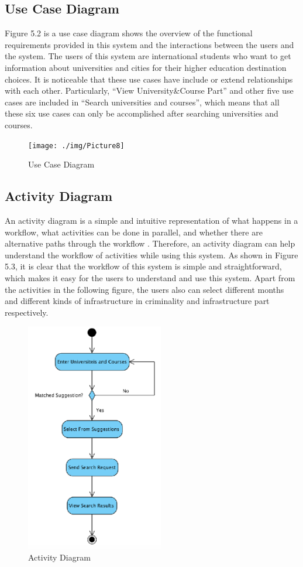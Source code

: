 \subsection{Use Case Diagram}
Figure 5.2 is a use case diagram shows the overview of the functional requirements provided in this system and the interactions between the users and the system. The users of this system are international students who want to get information about universities and cities for their higher education destination choices. It is noticeable that these use cases have include or extend relationships with each other. Particularly, “View University\&Course Part” and other five use cases are included in “Search universities and courses”, which means that all these six use cases can only be accomplished after searching universities and courses.

\begin{figure}[H]
  \centering
  \texttt{[image: ./img/Picture8]}
  \caption{Use Case Diagram}
  \label{Figure:figex}
\end{figure}

\subsection{Activity Diagram}
An activity diagram is a simple and intuitive representation of what happens in a workflow, what activities can be done in parallel, and whether there are alternative paths through the workflow \cite{IBM}. Therefore, an activity diagram can help understand the workflow of activities while using this system. As shown in Figure 5.3, it is clear that the workflow of this system is simple and straightforward, which makes it easy for the users to understand and use this system. Apart from the activities in the following figure, the users also can select different months and different kinds of infrastructure in criminality and infrastructure part respectively. 
 


\begin{figure}[H]
  \centering
  \includegraphics[width=6cm]{./img/Picture9}
  \caption{Activity Diagram
}
  \label{Figure:figex}
\end{figure}



